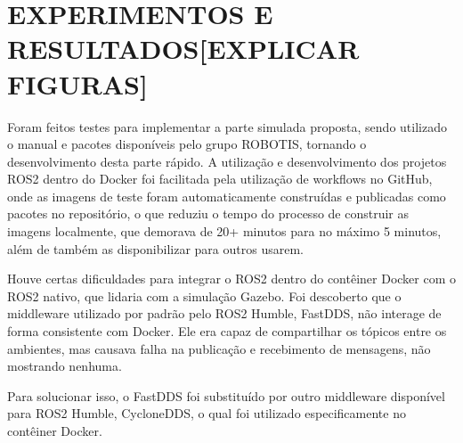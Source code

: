 \chapter{EXPERIMENTOS E RESULTADOS[EXPLICAR FIGURAS]}
\label{experimentos}

Foram feitos testes \cite{github_tcc_docker} para implementar a parte simulada proposta, sendo utilizado o manual \cite{turtlebot3_manual} e pacotes \cite{turtlebot3_github} disponíveis pelo grupo ROBOTIS, tornando o desenvolvimento desta parte rápido. A utilização e desenvolvimento dos projetos ROS2 dentro do Docker foi facilitada pela utilização de workflows no GitHub, onde as imagens de teste foram automaticamente construídas e publicadas como pacotes no repositório, o que reduziu o tempo do processo de construir as imagens localmente, que demorava de 20+ minutos para no máximo 5 minutos, além de também as disponibilizar para outros usarem.

Houve certas dificuldades para integrar o ROS2 dentro do contêiner Docker com o ROS2 nativo, que lidaria com a simulação Gazebo. Foi descoberto que o middleware utilizado por padrão pelo ROS2 Humble, FastDDS, não interage de forma consistente com Docker. Ele era capaz de compartilhar os tópicos entre os ambientes, mas causava falha na publicação e recebimento de mensagens, não mostrando nenhuma.

Para solucionar isso, o FastDDS foi substituído por outro middleware disponível para ROS2 Humble, CycloneDDS, o qual foi utilizado especificamente no contêiner Docker.

